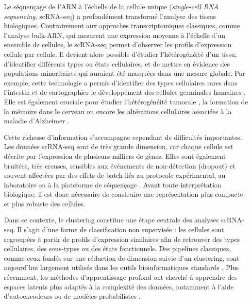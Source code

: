 Le séquençage de l'ARN à l'échelle de la cellule unique (\textit{single-cell RNA sequencing}, scRNA-seq) a profondément transformé l'analyse des tissus biologiques. Contrairement aux approches transcriptomiques classiques, comme l'analyse bulk-ARN, qui mesurent une expression moyenne à l'échelle d'un ensemble de cellules, le scRNA-seq permet d'observer les profils d'expression cellule par cellule. Il devient alors possible d'étudier l'hétérogénéité d'un tissu, d'identifier différents types ou états cellulaires, et de mettre en évidence des populations minoritaires qui auraient été masquées dans une mesure globale. Par exemple, cette technologie a permis d'identifier des types cellulaires rares dans l'intestin \cite{grun2015single} et de cartographier le développement des cellules germinales humaines \cite{Li2017}. Elle est également cruciale pour étudier l'hétérogénéité tumorale \cite{zhang2021single}, la formation de la mémoire dans le cerveau \cite{sardoo2022decoding} ou encore les altérations cellulaires associées à la maladie d'Alzheimer \cite{Mathys2019}.

Cette richesse d'information s'accompagne cependant de difficultés importantes. Les données scRNA-seq sont de très grande dimension, car chaque cellule est décrite par l'expression de plusieurs milliers de gènes. Elles sont également bruitées, très creuses, sensibles aux événements de non-détection (dropout) et souvent affectées par des effets de batch liés au protocole expérimental, au laboratoire ou à la plateforme de séquençage \cite{luecken2019current}. Avant toute interprétation biologique, il est donc nécessaire de construire une représentation plus compacte et plus robuste des cellules.

Dans ce contexte, le clustering constitue une étape centrale des analyses scRNA-seq. Il s'agit d'une forme de classification non supervisée : les cellules sont regroupées à partir de profils d'expression similaires afin de retrouver des types cellulaires, des sous-types ou des états fonctionnels. Des pipelines classiques, comme ceux fondés sur une réduction de dimension suivie d'un clustering, sont aujourd'hui largement utilisés dans les outils bioinformatiques standards \cite{Wolf2018Scanpy,kiselev2019challenges}. Plus récemment, les méthodes d'apprentissage profond ont cherché à apprendre des espaces latents plus adaptés à la complexité des données, notamment à l'aide d'autoencodeurs ou de modèles probabilistes \cite{Lopez2018scVI}.

